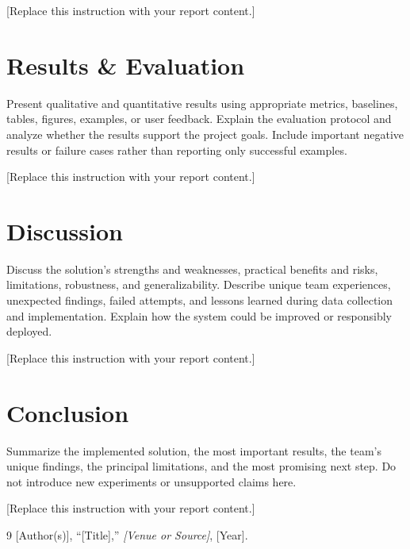 \documentclass{article}
\begin{document}
[Replace this instruction with your report content.]

\section{Results \& Evaluation}
Present qualitative and quantitative results using appropriate metrics, baselines, tables, figures, examples, or user feedback. Explain the evaluation protocol and analyze whether the results support the project goals. Include important negative results or failure cases rather than reporting only successful examples.


[Replace this instruction with your report content.]

\section{Discussion}
Discuss the solution's strengths and weaknesses, practical benefits and risks, limitations, robustness, and generalizability. Describe unique team experiences, unexpected findings, failed attempts, and lessons learned during data collection and implementation. Explain how the system could be improved or responsibly deployed.

[Replace this instruction with your report content.]

\section{Conclusion}
Summarize the implemented solution, the most important results, the team's unique findings, the principal limitations, and the most promising next step. Do not introduce new experiments or unsupported claims here.

[Replace this instruction with your report content.]

\begin{thebibliography}{9}
\small
{}
[Author(s)], ``[Title],'' \emph{[Venue or Source]}, [Year].
\end{thebibliography}

\end{document}
